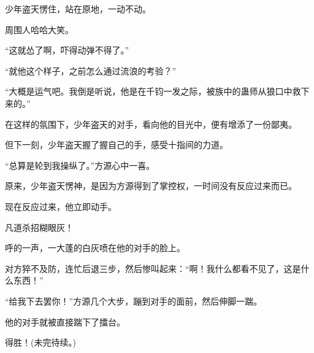 \begin{this_body}
少年盗天愣住，站在原地，一动不动。

周围人哈哈大笑。

“这就怂了啊，吓得动弹不得了。”

“就他这个样子，之前怎么通过流浪的考验？”

“大概是运气吧。我倒是听说，他是在千钧一发之际，被族中的蛊师从狼口中救下来的。”

在这样的氛围下，少年盗天的对手，看向他的目光中，便有增添了一份鄙夷。

但下一刻，少年盗天握了握自己的手，感受十指间的力道。

“总算是轮到我操纵了。”方源心中一喜。

原来，少年盗天愣神，是因为方源得到了掌控权，一时间没有反应过来而已。

现在反应过来，他立即动手。

凡道杀招糊眼灰！

呼的一声，一大蓬的白灰喷在他的对手的脸上。

对方猝不及防，连忙后退三步，然后惨叫起来：“啊！我什么都看不见了，这是什么东西！”

“给我下去罢你！”方源几个大步，蹦到对手的面前，然后伸脚一踹。

他的对手就被直接踹下了擂台。

得胜！(未完待续。)

\end{this_body}

